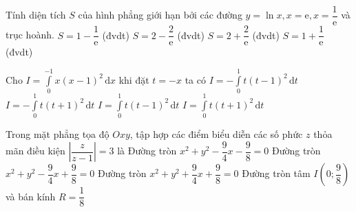 \begin{ex}%
	Tính diện tích $S$ của hình phẳng giới hạn bởi các đường $y=\ln x, x=\mathrm{e}, x=\dfrac{1}{\mathrm{e}}$ và trục hoành.
	\choice
	{$S=1-\dfrac{1}{\mathrm{e}}$ (đvdt)}
	{\True $S=2-\dfrac{2}{\mathrm{e}}$ (đvdt)}
	{$S=2+\dfrac{2}{\mathrm{e}}$ (đvdt)}
	{$S=1+\dfrac{1}{\mathrm{e}}$ (đvdt)}
\end{ex}

\begin{ex}%
	Cho $I=\displaystyle\int\limits_0^{-1} x(x-1)^2\mathrm{\,d}x$ khi đặt $t=-x$ ta có
	\choice
	{$I=-\displaystyle\int\limits_0^1 t(t-1)^2\mathrm{\,d}t$}
	{$I=-\displaystyle\int\limits_0^1 t(t+1)^2\mathrm{\,d}t$}
	{$I=\displaystyle\int\limits_0^1 t(t-1)^2\mathrm{\,d}t$}
	{\True $I=\displaystyle\int\limits_0^1 t(t+1)^2\mathrm{\,d}t$}
\end{ex}

\begin{ex}%
	Trong mặt phẳng tọa độ $Oxy$, tập hợp các điểm biểu diễn các số phức $z$ thỏa mãn điều kiện $\left|\dfrac{z}{z-1}\right|=3$ là
	\choice
	{Đường tròn $x^2+y^2-\dfrac{9}{4}x-\dfrac{9}{8}=0$}
	{\True Đường tròn $x^2+y^2-\dfrac{9}{4}x+\dfrac{9}{8}=0$}
	{Đường tròn $x^2+y^2+\dfrac{9}{4}x+\dfrac{9}{8}=0$}
	{Đường tròn tâm $I\left(0;\dfrac{9}{8}\right)$ và bán kính $R=\dfrac{1}{8}$}
\end{ex}

